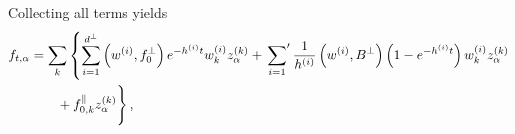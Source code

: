 \documentclass[11pt]{article}
\begin{document}
Collecting all terms yields
\begin{align}
    f_{t,\alpha} 
    &= \sum_{k} \left\{\sum_{i=1}^{d^\perp}  
        \left(w^{(i)}, f^\perp_0\right) e^{-h^{(i)}t} w^{(i)}_k z^{(k)}_\alpha
    + \sideset{}{'}\sum_{i=1}  \frac{1}{h^{(i)}} \left(w^{(i)}, B^\perp\right)
        \left(1 - e^{-h^{(i)}t}\right) w^{(i)}_k z^{(k)}_\alpha \right.\nonumber \\
        \label{eq:AnalyticSol}
    & \quad\quad + f^\parallel_{0,k} z^{(k)}_\alpha \Bigg\}\, ,
\end{align}



\end{document}
